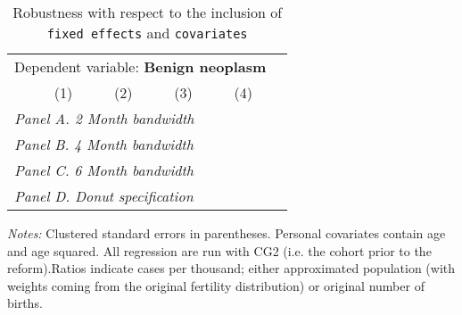  \begin{table}[H] \begin{threeparttable} \centering \caption{Robustness with respect to the inclusion of \texttt{fixed effects} and \texttt{covariates}} {\def\sym#1{\ifmmode^{#1}\else\(^{#1}\)\fi} \begin{tabular}{l*{5}{c}} \toprule \multicolumn{5}{c}{Dependent variable: \textbf{Benign neoplasm}} \\ \cmidrule(lr){2-5}
            &\multicolumn{1}{c}{(1)}&\multicolumn{1}{c}{(2)}&\multicolumn{1}{c}{(3)}&\multicolumn{1}{c}{(4)}\\
\midrule
 \multicolumn{5}{l}{\emph{Panel A. 2 Month bandwidth}} \\    \midrule\multicolumn{5}{l}{\emph{Panel B. 4 Month bandwidth}} \\    \midrule\multicolumn{5}{l}{\emph{Panel C. 6 Month bandwidth}} \\    \midrule\multicolumn{5}{l}{\emph{Panel D. Donut specification}} \\    \midrule  
\bottomrule \end{tabular} } \begin{tablenotes} \item \scriptsize \emph{Notes:} Clustered standard errors in parentheses. Personal covariates contain age and age squared. All regression are run with CG2 (i.e. the cohort prior to the reform).Ratios indicate cases per thousand; either approximated population (with weights coming from the original fertility distribution) or original number of births. \end{tablenotes} \end{threeparttable} \end{table} 
